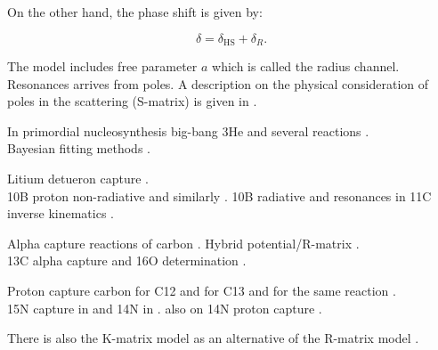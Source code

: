 \documentclass[openany]{book}
\begin{document}
On the other hand, the phase shift is given by:

\begin{equation}  \label{eq:rmatrix_phaseShift}
	\delta = \delta_{\mathrm{HS}} + \delta_R.
\end{equation}

The model includes free parameter $a$ which is called the radius channel. \\

Resonances arrives from poles. A description on the physical consideration of poles in the scattering (S-matrix) is given in \cite{ramirezjimenez_kelkar_2018}.


In primordial nucleosynthesis \cite{desouza_iliadis_coc_2019} big-bang 3He and several reactions \cite{sparta_pizzone_bertulani_hou_lamia_tumino_2020}. \\

Bayesian fitting methods \cite{odell_brune_phillips_2022}.

Litium detueron capture \cite{grineviciute_lamia_mukhamedzhanov_spitaleri_lacognata_2015}. \\

10B proton non-radiative \cite{kolk_macon_deboer_anderson_boeltzig_brandenburg_brune_chen_clark_danley_et_2022} and similarly \cite{sieverding_randhawa_zetterberg_deboer_ahn_mancino_martinez-pinedo_hix_2022}. 10B radiative and resonances in 11C inverse kinematics \cite{kaur_guimaraes_zamora_assuncao_alcantara-nunez_delara_zevallos_ribeiro_lichtenthaler_pires_et_2022}.

Alpha capture reactions of carbon \cite{schurmann_gialanella_kunz_strieder_2012}.  Hybrid potential/R-matrix \cite{sparenberg_2005}. \\ 13C alpha capture and 16O determination \cite{prusachenko_bobrovsky_bondarenko_bokhovko_gurbich_ketlerov_2022}.

Proton capture carbon \cite{burtebaev_igamov_peterson_yarmukhamedov_zazulin_2008} for C12 and \cite{chakraborty_deboer_mukherjee_roy_2015} for C13 and \cite{genard_descouvemont_terwagne_2010} for the same reaction . \\

15N capture in \cite{barker_2008} and 14N in \cite{angulo_champagne_trautvetter_2005}. also on 14N proton capture \cite{formicola_imbriani_costantini_angulo_bemmerer_bonetti_broggini_corvisiero_cruz_descouvemont_et_2004}.

There is also the K-matrix model as an alternative of the R-matrix model \cite{humblet_1990}.
\end{document}
